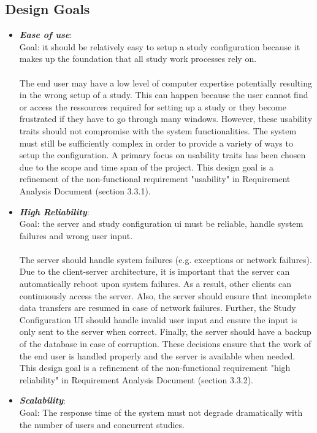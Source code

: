 \subsection{Design Goals}

\begin{itemize}
\item \textit{\bf{Ease of use}}: 
\\
Goal: it should be relatively easy to setup a study configuration because it makes up the foundation that all study work processes rely on. 
\\\\
The end user may have a low level of computer expertise potentially resulting in the wrong setup of a study.  This can happen because the user cannot find or access the ressources required for setting up a study or they become frustrated if they have to go through many windows. However, these usability traits should not compromise with the system functionalities. The system must still be sufficiently complex in order to provide a variety of ways to setup the configuration.  A primary focus on usability traits has been chosen due to the scope and time span of the project. This design goal is a refinement of the non-functional requirement  "usability" in Requirement Analysis Document  (section 3.3.1). 
\item \textit{\bf{High Reliability}}: 
\\
Goal: the server and study configuration ui must be reliable, handle system failures and wrong user input.
\\\\
The server should handle system failures (e.g. exceptions or network failures). Due to the client-server architecture, it is important that the server can automatically reboot upon system failures. As a result, other clients can continuously access the server. Also, the server should ensure that incomplete data transfers are resumed in case of network failures. Further, the Study Configuration UI should handle invalid user input and ensure the input is only sent to the server when correct. Finally, the server should have a backup of the database in case of corruption. These decisions ensure that the work of the end user is handled properly and the server is available when needed. This design goal is a refinement of the non-functional requirement "high reliability" in Requirement Analysis Document (section 3.3.2).  
\item \textit{\bf{Scalability}}:
\\
Goal: The response time of the system must not degrade dramatically with the number of users and concurrent studies. 

\end{itemize}
